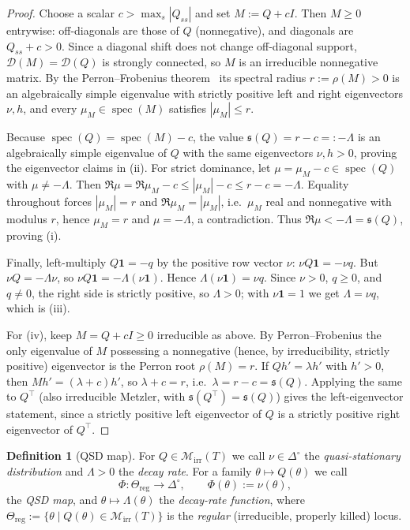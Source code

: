 \documentclass[11pt,reqno]{amsart}
\theoremstyle{plain}
\theoremstyle{definition}
\newtheorem{definition}[theorem]{Definition}
\theoremstyle{remark}
\newcommand{\Reg}{\Theta_{\mathrm{reg}}}
\newcommand{\Simp}{\Delta^{\!\circ}}
\newcommand{\one}{\mathbf{1}}
\newcommand{\abscissa}{\mathfrak{s}}
\newcommand{\dgraph}{\mathcal{D}}
\DeclareMathOperator{\spec}{spec}
\begin{document}
\begin{proof}
Choose a scalar $c>\max_{s}|Q_{ss}|$ and set $M:=Q+cI$. Then $M\ge0$ entrywise:
off-diagonals are those of $Q$ (nonnegative), and diagonals are $Q_{ss}+c>0$.
Since a diagonal shift does not change off-diagonal support, $\dgraph(M)=\dgraph(Q)$
is strongly connected, so $M$ is an irreducible nonnegative matrix. By the
Perron--Frobenius theorem~\cite[Thm.~8.4.4]{HornJohnson2013} its spectral radius
$r:=\rho(M)>0$ is an algebraically simple eigenvalue with strictly positive left
and right eigenvectors $\nu,h$, and every $\mu_M\in\spec(M)$ satisfies $|\mu_M|\le
r$.

Because $\spec(Q)=\spec(M)-c$, the value $\abscissa(Q)=r-c=:-\Lambda$ is an
algebraically simple eigenvalue of $Q$ with the same eigenvectors $\nu,h>0$,
proving the eigenvector claims in (ii). For strict dominance, let
$\mu=\mu_M-c\in\spec(Q)$ with $\mu\neq-\Lambda$. Then
$\Re\mu=\Re\mu_M-c\le|\mu_M|-c\le r-c=-\Lambda$. Equality throughout forces
$|\mu_M|=r$ and $\Re\mu_M=|\mu_M|$, i.e.\ $\mu_M$ real and nonnegative with modulus
$r$, hence $\mu_M=r$ and $\mu=-\Lambda$, a contradiction. Thus
$\Re\mu<-\Lambda=\abscissa(Q)$, proving (i).

Finally, left-multiply $Q\one=-q$ by the positive row vector $\nu$:
$\nu Q\one=-\nu q$. But $\nu Q=-\Lambda\nu$, so $\nu Q\one=-\Lambda(\nu\one)$.
Hence $\Lambda(\nu\one)=\nu q$. Since $\nu>0$, $q\ge0$, and $q\neq0$, the right
side is strictly positive, so $\Lambda>0$; with $\nu\one=1$ we get $\Lambda=\nu q$,
which is (iii).

For (iv), keep $M=Q+cI\ge0$ irreducible as above. By Perron--Frobenius the only
eigenvalue of $M$ possessing a nonnegative (hence, by irreducibility, strictly
positive) eigenvector is the Perron root $\rho(M)=r$. If $Qh'=\lambda h'$ with
$h'>0$, then $Mh'=(\lambda+c)h'$, so $\lambda+c=r$, i.e.\ $\lambda=r-c=\abscissa(Q)$.
Applying the same to $Q^{\top}$ (also irreducible Metzler, with
$\abscissa(Q^{\top})=\abscissa(Q)$) gives the left-eigenvector statement, since a
strictly positive left eigenvector of $Q$ is a strictly positive right eigenvector
of $Q^{\top}$.
\end{proof}

\begin{definition}[QSD map]\label{def:qsd-map}
For $Q\in\mathcal M_{\mathrm{irr}}(T)$ we call $\nu\in\Simp$ the
\emph{quasi-stationary distribution} and $\Lambda>0$ the \emph{decay rate}. For a
family $\theta\mapsto Q(\theta)$ we call
\[
\Phi\colon\Reg\longrightarrow\Simp,\qquad \Phi(\theta):=\nu(\theta),
\]
the \emph{QSD map}, and $\theta\mapsto\Lambda(\theta)$ the \emph{decay-rate
function}, where $\Reg:=\{\theta\mid Q(\theta)\in\mathcal M_{\mathrm{irr}}(T)\}$ is the
\emph{regular} (irreducible, properly killed) locus.
\end{definition}
\end{document}
